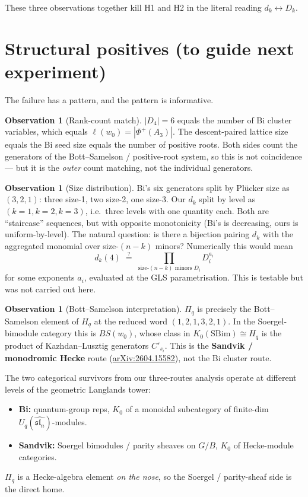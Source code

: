 \documentclass{article}
\theoremstyle{definition}
\newtheorem{observation}[theorem]{Observation}
\theoremstyle{remark}
\begin{document}
These three observations together kill H1 and H2 in the literal reading $d_k \leftrightarrow D_k$.

\section{Structural positives (to guide next experiment)}

The failure has a pattern, and the pattern is informative.

\begin{observation}[Rank-count match]
$|D_4| = 6$ equals the number of Bi cluster variables, which equals $\ell(w_0) = |\Phi^+(A_3)|$. The descent-paired lattice size equals the Bi seed size equals the number of positive roots. Both sides count the generators of the Bott--Samelson / positive-root system, so this is not coincidence --- but it is the \emph{outer} count matching, not the individual generators.
\end{observation}

\begin{observation}[Size distribution]
Bi's six generators split by Pl\"ucker size as $(3, 2, 1)$: three size-1, two size-2, one size-3. Our $d_k$ split by level as $(k=1, k=2, k=3)$, i.e.\ three levels with one quantity each. Both are ``staircase'' sequences, but with opposite monotonicity (Bi's is decreasing, ours is uniform-by-level). The natural question: is there a bijection pairing $d_k$ with the aggregated monomial over size-$(n-k)$ minors? Numerically this would mean
$$d_k(4) \;\stackrel{?}{=}\; \prod_{\text{size-}(n-k) \text{ minors } D_i} D_i^{a_i}$$
for some exponents $a_i$, evaluated at the GLS parametrisation. This is testable but was not carried out here.
\end{observation}

\begin{observation}[Bott--Samelson interpretation]
$\Pi_q$ is precisely the Bott--Samelson element of $H_q$ at the reduced word $(1,2,1,3,2,1)$. In the Soergel-bimodule category this is $BS(w_0)$, whose class in $K_0(\text{SBim}) \cong H_q$ is the product of Kazhdan--Lusztig generators $C'_{s_i}$. This is the \textbf{Sandvik / monodromic Hecke} route (\href{https://arxiv.org/abs/2604.15582}{arXiv:2604.15582}), not the Bi cluster route.

The two categorical survivors from our three-routes analysis operate at different levels of the geometric Langlands tower:
\begin{itemize}
\item \textbf{Bi:} quantum-group reps, $K_0$ of a monoidal subcategory of finite-dim $U_q(\widehat{\mathfrak{sl}_n})$-modules.
\item \textbf{Sandvik:} Soergel bimodules / parity sheaves on $G/B$, $K_0$ of Hecke-module categories.
\end{itemize}
$\Pi_q$ is a Hecke-algebra element \emph{on the nose}, so the Soergel / parity-sheaf side is the direct home.
\end{observation}
\end{document}
